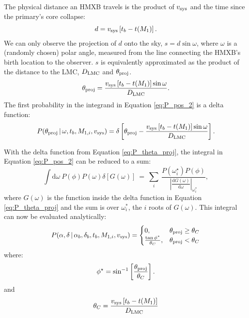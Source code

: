 \documentclass[12pt, preprint]{aastex}
\newcommand{\given}{\,|\,}
\newcommand{\dd}{\mathrm{d}}
\begin{document}
The physical distance an HMXB travels is the product of $v_{\rm sys}$ and the time since the primary's core collapse:
\begin{equation}
d = v_{\rm sys} \left[t_b - t(M_1) \right].  
\end{equation}
We can only observe the projection of $d$ onto the sky, $s = d \sin \omega$, where $\omega$ is a (randomly chosen) polar angle, measured from the line connecting the HMXB's birth location to the observer. $s$ is equivalently approximated as the product of the distance to the LMC, $D_{\rm LMC}$ and $\theta_{\rm proj}$.
\begin{equation}
\theta_{\rm proj} = \frac{v_{\rm sys} \left[ t_b - t(M_1) \right] \sin \omega}{D_{\rm LMC}}. \label{eq:theta_proj}
\end{equation}
The first probability in the integrand in Equation \ref{eq:P_pos_2} is a delta function:
\begin{equation}
P(\theta_{\rm proj} \given \omega, t_b, M_{1,i}, v_{\rm sys}) = \delta \left[ \theta_{\rm proj} - \frac{v_{\rm sys} \left[t_b - t(M_1) \right] \sin \omega}{D_{\rm LMC}} \right]. \label{eq:P_theta_proj}
\end{equation}


With the delta function from Equation \ref{eq:P_theta_proj}, the integral in Equation \ref{eq:P_pos_2} can be reduced to a sum:
\begin{equation}
\int \dd \omega\ P(\phi) P(\omega) \delta \left[ G(\omega) \right]\  =\ \sum_i\ \frac{P(\omega_i^{\star}) P(\phi)}{ \left| \frac{ \dd G (\omega) }{\dd \omega} \right|_{\omega_i^*}},
\end{equation}
where $G(\omega)$ is the function inside the delta function in Equation \ref{eq:P_theta_proj} and the sum is over $\omega_i^*$, the $i$ roots of $G(\omega)$. This integral can now be evaluated analytically:
\begin{equation}
P(\alpha, \delta \given \alpha_b, \delta_b, t_b, M_{1,i}, v_{\rm sys} ) =
\begin{cases} 
      0, & \theta_{\rm proj} \geq \theta_C\\
     \frac{\tan \phi^*}{\theta_C} , & \theta_{\rm proj} < \theta_C 
   \end{cases}
\end{equation}
where:
\begin{equation}
\phi^{\star} = \sin^{-1} \left[ \frac{\theta_{\rm proj}}{\theta_C} \right].
\end{equation}
and
\begin{equation}
\theta_C = \frac{v_{\rm sys} \left[ t_b - t(M_1) \right]}{D_{\rm LMC}} \label{eq:theta_c}
\end{equation}
\end{document}
